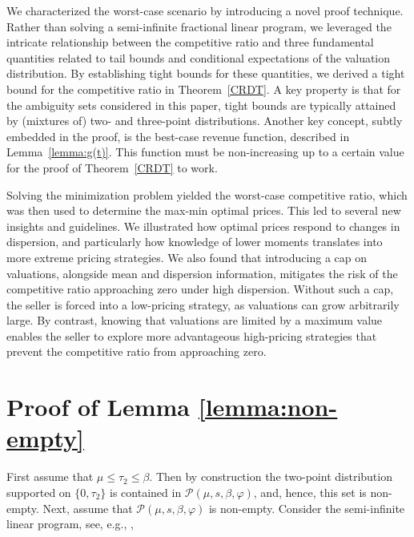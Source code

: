 \documentclass[11pt]{article}
\newcommand{\cPpar}{\mathcal{P}(\mu,s,\beta,\varphi)}
\newcommand{\1}{\mathds{1}}
\begin{document}
We characterized the worst-case scenario by introducing a novel proof technique. Rather than solving a semi-infinite fractional linear program, we leveraged the intricate relationship between the competitive ratio and three fundamental quantities related to tail bounds and conditional expectations of the valuation distribution. By establishing tight bounds for these quantities, we derived a tight bound for the competitive ratio in Theorem~\ref{CRDT}. 
A key property is that for the ambiguity sets considered in this paper, tight bounds are typically attained by (mixtures of) two- and three-point distributions.
Another key concept, subtly embedded in the proof, is the best-case revenue function, described in Lemma~\ref{lemma:g(t)}. This function must be non-increasing up to a certain value for the proof of Theorem~\ref{CRDT} to work.

Solving the minimization problem yielded the worst-case competitive ratio, which was then used to determine the max-min optimal prices. This led to several new insights and guidelines. We illustrated how optimal prices respond to changes in dispersion, and particularly how knowledge of lower moments translates into more extreme pricing strategies.
We also found that introducing a cap on valuations, alongside mean and dispersion information, mitigates the risk of the competitive ratio approaching zero under high dispersion. Without such a cap, the seller is forced into a low-pricing strategy, as valuations can grow arbitrarily large. By contrast, knowing that valuations are limited by a maximum value enables the seller to explore more advantageous high-pricing strategies that prevent the competitive ratio from approaching zero.

\begin{small}

\end{small}

\newpage
\appendix
\section{Proof of Lemma \ref{lemma:non-empty}}\label{ap:proof_lne}
First assume that $\mu \leq \tau_2 \leq \beta$. Then by construction the two-point distribution supported on $\{0,\tau_2\}$ is contained in $\cPpar$, and, hence, this set is non-empty. Next, assume that $\cPpar$ is non-empty. Consider the semi-infinite linear program, see, e.g., \cite{popescu2005semidefinite}, 
\end{document}
